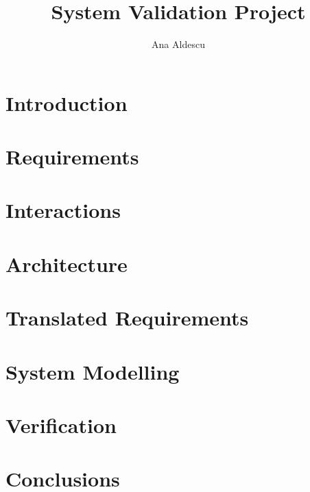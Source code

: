 \documentclass[a4paper,11pt]{report}
\title{System Validation Project}
\author{Ana Aldescu}
\begin{document}
	\newenvironment{frontmatter}{\pagenumbering{roman}}{\newpage {}}
	\begin{frontmatter}
		
		\newpage
		
		\tableofcontents
	\end{frontmatter}
	
	\chapter{Introduction}
	\label{chap:intro}
	
	\newpage
	
	\chapter{Requirements}
	\label{chap:reqs}
	
	\newpage
	
	\chapter{Interactions}
	\label{chap:interact}
	
	\newpage
		 
	\chapter{Architecture}
	\label{chap:arch}
			 
	\newpage
	
	
	\chapter{Translated Requirements}
	\label{chap:transReq}
	
	\newpage
	   	
	\chapter{System Modelling}
	\label{chap:model}
	
	\newpage
	
	\chapter{Verification}
	\label{chap:verif}
	
	\newpage
	
	\chapter{Conclusions}
	\label{chap:concl}
	
	\newpage
	

%
%
\end{document}

